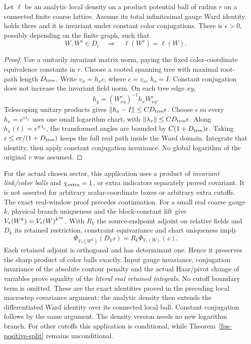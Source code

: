 \begin{lemma}
\label{fps-overlap}
Let \(\ell\) be an analytic local density on a product potential ball of
radius \(r\) on a connected finite coarse lattice. Assume its total
infinitesimal gauge Ward identity holds there and it is invariant under
constant color conjugations. There is \(\epsilon>0\), possibly depending
on the finite graph, such that
\begin{equation}
 W,W^v\in D_\epsilon\quad\Longrightarrow\quad
 \ell(W^v)=\ell(W).
 \label{fps-overlap-identity}
\end{equation}
\end{lemma}
\begin{proof}
Use a unitarily invariant matrix norm, paying the fixed color-coordinate
equivalence constants in \(r\). Choose a rooted spanning tree with
maximal root-path length \(D_{\rm tree}\). Write \(v_x=h_xc\), where
\(c=v_o\), \(h_o=I\). Constant conjugation does not increase the
invariant field norm. On each tree edge \(xy\),
\[
 h_y=(W^v_{xy})^{-1}h_xW^c_{xy}.
\]
Telescoping unitary products gives
\(\|h_x-I\|\le C D_{\rm tree}\epsilon\).
Choose \(\epsilon\) so every \(h_x=e^{i\lambda_x}\) uses one small
logarithm chart, with
\(\|\lambda_x\|\le C D_{\rm tree}\epsilon\).
Along \(h_x(t)=e^{it\lambda_x}\), the transformed angles are bounded by
\(C(1+D_{\rm tree})\epsilon\). Taking
\(\epsilon\le cr/(1+D_{\rm tree})\) keeps the full real path inside
the Ward domain. Integrate that identity, then apply constant
conjugation invariance. No global logarithm of the original \(v\)
was assumed.
\end{proof}

For the actual chosen sector, this application uses a product of
\emph{invariant link/color balls} and \(\chi_{\rm extra}=1\), or extra
indicators separately proved covariant. It is not asserted for arbitrary
scalar-coordinate boxes or arbitrary extra cutoffs. The exact real-window
proof precedes continuation. For a small real coarse gauge \(k\), physical
branch uniqueness and the block-constant lift give
\(V_*(W^k)=V_*(W)^{k^{\rm up}}\). With \(R_k\) the source-endpoint
adjoint on relative fields and \(D_k\) its retained restriction,
constraint equivariance and chart uniqueness imply
\[
 \Phi_{V_*(W^k)}(D_kz)=R_k\Phi_{V_*(W)}(z).
\]
Each retained adjoint is orthogonal and has determinant one. Hence it
preserves the sharp product of color balls exactly. Input gauge
invariance, conjugation invariance of the absolute contour penalty and
the actual Haar/pivot change of variables prove equality of the
\emph{literal real retained integrals}. No cutoff boundary term is
omitted. These are the exact identities proved in the preceding local
macrostep covariance argument; the analytic density then extends the
differentiated Ward identity over its connected local ball. Constant
conjugation follows by the same argument. The density version needs no
new logarithm branch. For other cutoffs this application is conditional,
while Theorem~\ref{fps-positive-split} remains unconditional.

